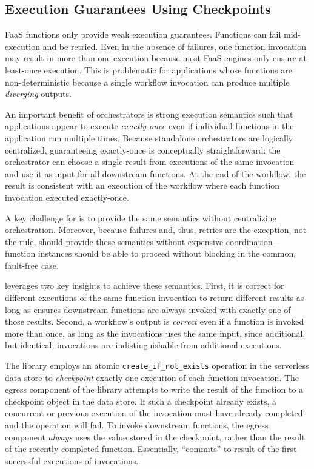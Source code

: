\subsection{Execution Guarantees Using Checkpoints}\label{sec:design:execution}

FaaS functions only provide weak execution guarantees. Functions can fail
mid-execution and be retried. Even in the absence of failures, one function
invocation may result in more than one execution because most FaaS engines
only ensure at-least-once execution. This is problematic for applications
whose functions are non-deterministic because a single workflow invocation can
produce multiple \emph{diverging} outputs.

An important benefit of orchestrators is strong execution semantics such that
applications appear to execute \emph{exactly-once} even if individual
functions in the application run multiple times. Because standalone
orchestrators are logically centralized, guaranteeing exactly-once is
conceptually straightforward: the orchestrator can choose a single result from
executions of the same invocation and use it as input for all downstream
functions. At the end of the workflow, the result is consistent with an
execution of the workflow where each function invocation executed
exactly-once.

A key challenge for \name{} is to provide the same semantics without
centralizing orchestration. Moreover, because failures and, thus, retries are
the exception, not the rule, \name{} should provide these semantics without
expensive coordination---function instances should be able to proceed without
blocking in the common, fault-free case.

\name{} leverages two key insights to achieve these semantics.  First, it is
 correct for different executions of the same function invocation to return
 different results as long as \name{} ensures downstream functions are always
 invoked with exactly one of those results. Second, a workflow's output is
\emph{correct} even if a function is invoked more than once, as long as the
invocations uses the same input, since additional, but identical, invocations
are indistinguishable from additional executions.

The \name{} library employs an atomic \texttt{create\_if\_not\_exists}
operation in the serverless data store to \emph{checkpoint} exactly one
execution of each function invocation. The egress component of the \name{}
library attempts to write the result of the function to a checkpoint object in
the data store. If such a checkpoint already exists, a concurrent or previous
execution of the invocation must have already completed and the operation will
fail. To invoke downstream functions, the egress component \emph{always} uses
the value stored in the checkpoint, rather than the result of the recently
completed function. Essentially, \name{} ``commits'' to result of the first
successful executions of invocations.

